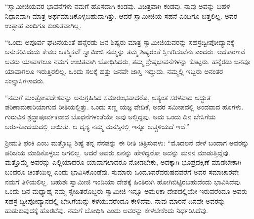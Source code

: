 \vskip 2pt

 “ಸ್ವಾಮೀಜಿಯವರ ಭಾವನೆಗಳು ನಮಗೆ ಹೊಸದಾಗಿ ಕಂಡವು. ವಿಚಿತ್ರವಾಗಿ ಕಂಡವು. ನಾವು ಅವನ್ನು ಬಹಳ ನಿಧಾನವಾಗಿ ಮಾತ್ರ ಅರ್ಥಮಾಡಿಕೊಳ್ಳಬಹುದಾಗಿತ್ತು. ಆದರೆ ಸ್ವಾಮೀಜಿಯ ಸಹನೆ ಎಂದಿಗೂ ಬತ್ತಲಿಲ್ಲ. ಅವರ ಉತ್ಸಾಹ ಎಂದಿಗೂ ಕುಂಠಿತವಾಗಿಲ್ಲ.

\vskip 2pt

 “ಒಂದು ಅಪೂರ್ವ ಘಟನೆಯಂತೆ ಹನ್ನೆರಡು ಜನ ಶಿಷ್ಯರು ಮಾತ್ರ ಸ್ವಾಮೀಜಿಯವರನ್ನು ಸಹಸ್ರದ್ವೀಪೋದ್ಯಾನಕ್ಕೆ ಅನುಸರಿಸಿದುದು ಕೇವಲ ಆಕಸ್ಮಿಕವೆ! ಸ್ವಾಮೀಜಿ ನಮ್ಮನ್ನು ತಮ್ಮ ಶಿಷ್ಯರಂತೆ ಸ್ವೀಕರಿಸುವೆನು ಎಂದರು. ಆದಕಾರಣವೆ ಅವರು ಯಾವಾಗಲೂ ನಮಗೆ ಉಚಿತವಾಗಿ ಬೋಧಿಸಿದರು, ತಮ್ಮ ಶ್ರೇಷ್ಠಭಾವನೆಗಳನ್ನು ಕೊಟ್ಟರು. ಹನ್ನೆರಡು ಜನವೂ ಯಾವಾಗಲೂ ಇರುತ್ತಿರಲಿಲ್ಲ. ಒಂದು ಸಲಕ್ಕೆ ಹತ್ತು ಜನವೇ ಜಾಸ್ತಿ ಇದ್ದುದು. ನಮ್ಮಲ್ಲಿ ಇಬ್ಬರು ಅನಂತರ ಸಂನ್ಯಾಸಿಗಳಾದರು.

\vskip 2pt

 “ನಮಗೆ ಮಂತ್ರೋಪದೇಶವನ್ನು ಅನುಗ್ರಹಿಸಿದ ಸಮಾರಂಭವಾದರೊ, ಅತ್ಯಂತ ಸರಳವಾದ ಅದ್ಭುತ ಪರಿಣಾಮಕಾರಿಯಾಗುವ ರೀತಿಯಲ್ಲಿತ್ತು. ಒಂದು ಸಣ್ಣ ಯಜ್ಞ ವೇದಿಕೆ, ಅದರ ಸಮೀಪದಲ್ಲಿ ಅಂದವಾದ ಹೂಗಳು. ಗುರುವಿನ ಶ್ರದ್ಧಾಪೂರ್ವಕವಾದ ಬೊಧನೆಗಳಂತೆಯೇ ಅವು ಅಲ್ಲಿದ್ದವು. ಅದು ಒಂದು ದಿನ ಬೇಸಿಗೆಯ ಅರುಣೋದಯದಲ್ಲಿ ಆಯಿತು. ಆ ದೃಶ್ಯ ನಮ್ಮ ಮನಸ್ಸಿನಲ್ಲಿ ಇನ್ನೂ ಅಚ್ಚಳಿಯದೆ ಇದೆ.”

\vskip 2pt

 ಶ‍್ರೀಮತಿ ಫಂಕಿ ಎಂಬ ಮತ್ತೊಬ್ಬ ಶಿಷ್ಯೆ ತನ್ನ ನೆನಪನ್ನು ಈ ರೀತಿ ಚಿತ್ರಿಸುವಳು: “ಮೊದಲನೆ ವೇಳೆ ಬಂದಾಗ ಅವರನ್ನು ಪರಿಚಯ ಮಾಡಿಕೊಳ್ಳಲು ಆಗಲಿಲ್ಲ. ಆದರೆ ಅವರು ಏನನ್ನು ಹೇಳಿದ್ದರೋ ಅದನ್ನು ಮನನ ಮಾಡುತ್ತಿದ್ದೆವು. ಮತ್ತೊಮ್ಮೆ ಅವರನ್ನು ಎಲ್ಲಿಯಾದರೂ ಯಾವಾಗಲಾದರೂ ನೋಡಬೇಕು, ಅದಕ್ಕಾಗಿ ಭೂಪ್ರದಕ್ಷಿಣೆ ಮಾಡಬೇಕಾಗಿ ಬಂದರೂ ಚಿಂತೆಯಿಲ್ಲ ಎಂದು ಭಾವಿಸಿಕೊಂಡೆವು. ಸುಮಾರು ಒಂದೂವರೆ\break ವರುಷದವರೆಗೆ ಅವರ ಸಮಾಚಾರವೇ ನಮಗೆ ತಿಳಿಯಲಿಲ್ಲ. ಬಹುಶಃ ಸ್ವಾಮೀಜಿ ಇಂಡಿಯಾ ದೇಶಕ್ಕೆ ಹಿಂತಿರುಗಿ ಹೋಗಿಬಿಟ್ಟಿರಬಹುದೆಂದು ಭಾವಿಸಿದೆವು. ಒಂದು ದಿನ ಮಧ್ಯಾಹ್ನ ನಮ್ಮ ಸ್ನೇಹಿತರೊಬ್ಬರು ಸ್ವಾಮೀಜಿ ಇನ್ನೂ ಅಮೆರಿಕಾ ದೇಶದಲ್ಲಿಯೇ ಇರುವರೆಂದೂ ಅವರು ಸಹಸ್ರ ದ್ವೀಪೋದ್ಯಾನದಲ್ಲಿ ಬೇಸಿಗೆಯನ್ನು ಕಳೆಯುವರೆಂದೂ ಕೇಳಿದೆವು. ನಾವು ಮಾರನೆ ದಿನವೇ ಅವರನ್ನು ಹುಡುಕುವುದಕ್ಕೆ ಹೊರಟೆವು. ನಮಗೆ ಬೋಧಿಸಿ ಎಂದು ಅವರನ್ನು ಕೇಳಬೇಕೆಂದು ನಿರ್ಧರಿಸಿದೆವು.

\vskip 2pt

